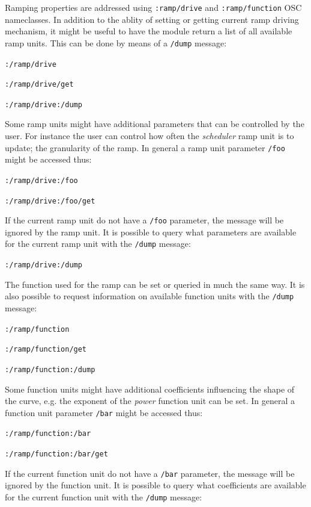 \documentclass{NIME-alternate}
\begin{document}
Ramping properties are addressed using \texttt{:ramp/drive} and \texttt{:ramp/function} OSC nameclasses. In addition to the ablity of setting or getting current ramp driving mechanism, it might be useful to have the module return a list of all available ramp units. This can be done by means of a \texttt{/dump} message:

\texttt{:/ramp/drive}

\texttt{:/ramp/drive/get}

\texttt{:/ramp/drive:/dump}

Some ramp units might have additional parameters that can be controlled by the user. For instance the user can control how often the \emph{scheduler} ramp unit is to update; the granularity of the ramp.  In general a ramp unit parameter \texttt{/foo} might be accessed thus:


\texttt{:/ramp/drive:/foo}

\texttt{:/ramp/drive:/foo/get}

If the current ramp unit do not have a \texttt{/foo} parameter, the message will be ignored by the ramp unit. It is possible to query what parameters are available for the current ramp unit with the \texttt{/dump} message:

\texttt{:/ramp/drive:/dump}

The function used for the ramp can be set or queried in much the same way. It is also possible to request information on available function units with the \texttt{/dump} message:

\texttt{:/ramp/function}

\texttt{:/ramp/function/get}

\texttt{:/ramp/function:/dump}

Some function units might have additional coefficients influencing the shape of the curve, e.g. the exponent of the \emph{power} function unit can be set. In general a function unit parameter \texttt{/bar} might be accessed thus:

\texttt{:/ramp/function:/bar}

\texttt{:/ramp/function:/bar/get}

If the current function unit do not have a \texttt{/bar} parameter, the message will be ignored by the function unit. It is possible to query what coefficients are available for the current function unit with the \texttt{/dump} message:
\end{document}
